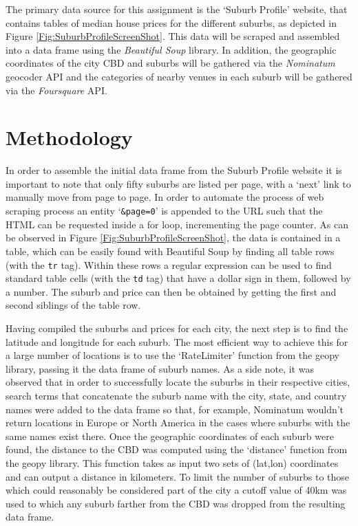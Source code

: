 \documentclass[12pt]{article}
\begin{document}
    The primary data source for this assignment is the `Suburb Profile' website, that contains tables of median house prices for the different suburbs, as depicted in Figure \ref{Fig:SuburbProfileScreenShot}. This data will be scraped and assembled into a data frame using the \emph{Beautiful Soup} library. In addition, the geographic coordinates of the city CBD and suburbs will be gathered via the \emph{Nominatum} geocoder API and the categories of nearby venues in each suburb will be gathered via the \emph{Foursquare} API.

\section{Methodology}

    In order to assemble the initial data frame from the Suburb Profile website it is important to note that only fifty suburbs are listed per page, with a `next' link to manually move from page to page. In order to automate the process of web scraping process an entity `\texttt{\&page=0}' is appended to the URL such that the HTML can be requested inside a for loop, incrementing the page counter. As can be observed in Figure \ref{Fig:SuburbProfileScreenShot}, the data is contained in a table, which can be easily found with Beautiful Soup by finding all table rows (with the \texttt{tr} tag). Within these rows a regular expression can be used to find standard table cells (with the \texttt{td} tag) that have a dollar sign in them, followed by a number. The suburb and price can then be obtained by getting the first and second siblings of the table row.

    Having compiled the suburbs and prices for each city, the next step is to find the latitude and longitude for each suburb. The most efficient way to achieve this for a large number of locations is to use the `RateLimiter' function from the geopy library, passing it the data frame of suburb names. As a side note, it was observed that in order to successfully locate the suburbs in their respective cities, search terms that concatenate the suburb name with the city, state, and country names were added to the data frame so that, for example, Nominatum wouldn't return locations in Europe or North America in the cases where suburbs with the same names exist there. Once the geographic coordinates of each suburb were found, the distance to the CBD was computed using the `distance' function from the geopy library. This function takes as input two sets of (lat,lon) coordinates and can output a distance in kilometers. To limit the number of suburbs to those which could reasonably be considered part of the city a cutoff value of 40km was used to which any suburb farther from the CBD was dropped from the resulting data frame.
\end{document}
